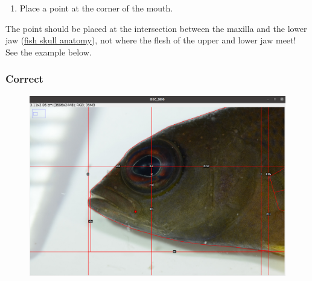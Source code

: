 \documentclass[
  letterpaper,
  DIV=11,
  numbers=noendperiod,
  oneside]{scrreprt}
\providecommand{\tightlist}{%
  \setlength{\itemsep}{0pt}\setlength{\parskip}{0pt}}\usepackage{longtable,booktabs,array}
\begin{document}
\begin{enumerate}
\def\labelenumi{\arabic{enumi}.}
\setcounter{enumi}{12}
\tightlist
\item
  Place a point at the corner of the mouth.
\end{enumerate}

\begin{tcolorbox}[standard jigsaw,arc=.35mm, toptitle=1mm, titlerule=0mm, bottomtitle=1mm, left=2mm, colbacktitle=quarto-callout-important-color!10!white, colback=white, opacityback=0, leftrule=.75mm, title=\textcolor{quarto-callout-important-color}{\faExclamation}\hspace{0.5em}{Important}, coltitle=black, rightrule=.15mm, bottomrule=.15mm, toprule=.15mm, opacitybacktitle=0.6, colframe=quarto-callout-important-color-frame]
The point should be placed at the intersection between the maxilla and
the lower jaw
(\href{https://en.wikipedia.org/wiki/Fish_jaw\#/media/File:FishKeyDay.jpg}{fish
skull anatomy}), not where the flesh of the upper and lower jaw meet!
See the example below.
\end{tcolorbox}

\hypertarget{correct}{%
\subsubsection{\texorpdfstring{\textbf{Correct}}{Correct}}\label{correct}}

\begin{figure}

{\centering \includegraphics{./images/screenshots/mouth_corner_correct.png}

}

\end{figure}
\end{document}
